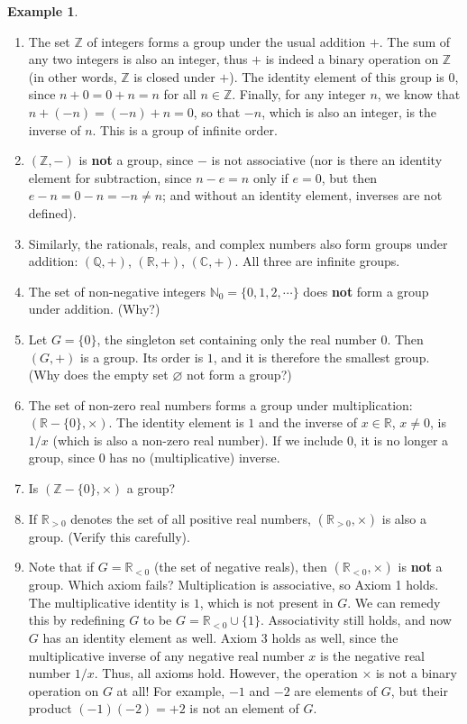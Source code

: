 \documentclass[svgnames]{article}
\theoremstyle{definition}
\newtheorem{Example}[Example]{Example}
\theoremstyle{remark}
\begin{document}
\begin{Example}\label{ex:Groups}
\begin{enumerate}
\item\label{it:GrpExZ} The set $\mathbb Z$ of integers forms a group under the usual addition $+$. The sum of any two integers is also an integer, thus $+$ is indeed a binary operation on $\mathbb Z$ (in other words, $\mathbb Z$ is closed under $+$). The identity element of this group is $0$, since $n + 0 = 0 + n = n$ for all $n \in \mathbb Z$. Finally, for any integer $n$, we know that $n + (-n) = (-n) + n = 0$, so that $-n$, which is also an integer, is the inverse of $n$. This is a group of infinite order.
\item $(\mathbb Z, -)$ is \textbf{not} a group, since $-$ is not associative (nor is there an identity element for subtraction, since $n - e = n$ only if $e = 0$, but then $e - n = 0 - n = -n \ne n$; and without an identity element, inverses are not defined).
\item\label{it:GrpExQRC} Similarly, the rationals, reals, and complex numbers also form groups under addition: $(\mathbb Q, +)$, $(\mathbb R, +)$, $(\mathbb C, +)$. All three are infinite groups.
\item The set of non-negative integers $\mathbb N_0 = \{0, 1, 2, \cdots\}$ does \textbf{not} form a group under addition. (Why?)
\item\label{it:GrpEx0} Let $G = \{0\}$, the singleton set containing only the real number $0$. Then $(G, +)$ is a group. Its order is $1$, and it is therefore the smallest group. (Why does the empty set $\varnothing$ not form a group?)
\item\label{it:GrpExR*} The set of non-zero real numbers forms a group under multiplication: $(\mathbb R - \{0\}, \times)$. The identity element is $1$ and the inverse of $x \in \mathbb R$, $x \ne 0$, is $1/x$ (which is also a non-zero real number). If we include $0$, it is no longer a group, since $0$ has no (multiplicative) inverse.
\item Is $(\mathbb Z - \{0\}, \times)$ a group?
\item\label{it:GrpExR>0} If $\mathbb R_{>0}$ denotes the set of all positive real numbers, $(\mathbb R_{>0}, \times)$ is also a group. (Verify this carefully).
\item Note that if $G = \mathbb R_{<0}$ (the set of negative reals), then $(\mathbb R_{<0}, \times)$ is \textbf{not} a group. Which axiom fails? Multiplication is associative, so Axiom 1 holds. The multiplicative identity is $1$, which is not present in $G$. We can remedy this by redefining $G$ to be $G = \mathbb R_{<0} \cup \{1\}$. Associativity still holds, and now $G$ has an identity element as well. Axiom 3 holds as well, since the multiplicative inverse of any negative real number $x$ is the negative real number $1/x$. Thus, all axioms hold. However, the operation $\times$ is not a binary operation on $G$ at all! For example, $-1$ and $-2$ are elements of $G$, but their product $(-1)(-2) = +2$ is not an element of $G$.

\end{enumerate}
\end{Example}
\end{document}
